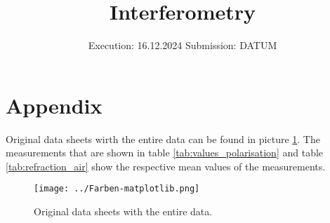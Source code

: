 

\subject{v64}
\title{Interferometry}
\date{%
  Execution: 16.12.2024
  \hspace{3em}
  Submission: DATUM
}



\maketitle
\thispagestyle{empty}
\tableofcontents
\newpage






\printbibliography{}

\appendix
\newpage

\section{Appendix}
\label{sec:appendix}

Original data sheets wirth the entire data can be found in picture \ref{fig:original_data}.
The measurements that are shown in table \ref{tab:values_polarisation} and table \ref{tab:refraction_air} show the respective mean values of the measurements.

\begin{figure}[H]
    \centering
    \texttt{[image: ../Farben-matplotlib.png]}
    \caption{Original data sheets with the entire data.}
    \label{fig:original_data}
\end{figure}



